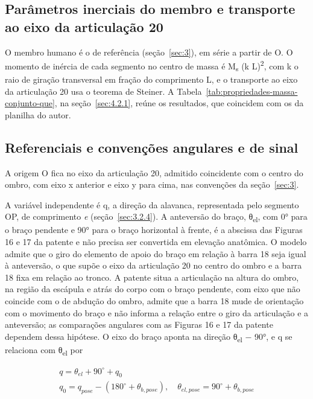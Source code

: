 \subsection{Parâmetros inerciais do membro e transporte ao eixo da articulação 20}\label{sec:3.2.2}

O membro humano é o de referência (seção~\ref{sec:3}), em série a partir de O. O momento de inércia de cada segmento no centro de massa é M\textsubscript{s} (k L)\textsuperscript{2}, com k o raio de giração transversal em fração do comprimento L, e o transporte ao eixo da articulação 20 usa o teorema de Steiner. A Tabela~\ref{tab:propriedades-massa-conjunto-que}, na seção~\ref{sec:4.2.1}, reúne os resultados, que coincidem com os da planilha do autor.

\subsection{Referenciais e convenções angulares e de sinal}\label{sec:3.2.3}

A origem O fica no eixo da articulação 20, admitido coincidente com o centro do ombro, com eixo x anterior e eixo y para cima, nas convenções da seção~\ref{sec:3}.

A variável independente é q, a direção da alavanca, representada pelo segmento OP, de comprimento \textit{e} (seção~\ref{sec:3.2.4}). A anteversão do braço, θ\textsubscript{el}, com 0° para o braço pendente e 90° para o braço horizontal à frente, é a abscissa das Figuras 16 e 17 da patente e não precisa ser convertida em elevação anatômica. O modelo admite que o giro do elemento de apoio do braço em relação à barra 18 seja igual à anteversão, o que supõe o eixo da articulação 20 no centro do ombro e a barra 18 fixa em relação ao tronco. A patente situa a articulação na altura do ombro, na região da escápula e atrás do corpo com o braço pendente, com eixo que não coincide com o de abdução do ombro, admite que a barra 18 mude de orientação com o movimento do braço e não informa a relação entre o giro da articulação e a anteversão; as comparações angulares com as Figuras 16 e 17 da patente dependem dessa hipótese. O eixo do braço aponta na direção θ\textsubscript{el} − 90°, e q se relaciona com θ\textsubscript{el} por

\begin{gather}
  q = \theta_{el} + 90^{\circ} + q_{0} \label{eq:32} \\
  q_{0} = q_{pose} - (180^{\circ} + \theta_{b,pose}),\quad\theta_{el,pose} = 90^{\circ} + \theta_{b,pose} \label{eq:33}
\end{gather}

